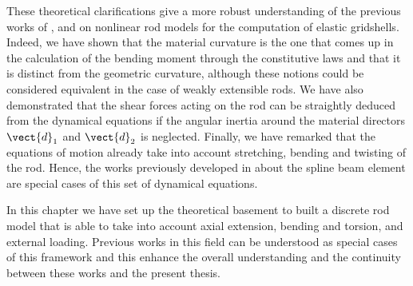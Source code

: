 These theoretical clarifications give a more robust understanding of the previous works of ,  and  on nonlinear rod models for the computation of elastic gridshells. Indeed, we have shown that the material curvature is the one that comes up in the calculation of the bending moment through the constitutive laws and that it is distinct from the geometric curvature, although these notions could be considered equivalent in the case of weakly extensible rods. We have also demonstrated that the shear forces acting on the rod can be straightly deduced from the dynamical equations if the angular inertia around the material directors $\vect{d}_1$ and $\vect{d}_2$ is neglected. Finally, we have remarked that the equations of motion already take into account stretching, bending and twisting of the rod. Hence, the works previously developed in \cite{Adriaenssens1999,Douthe2007} about the  spline beam element are special cases of this set of dynamical equations.

In this chapter we have set up the theoretical basement to built a discrete rod model that is able to take into account axial extension, bending and torsion, and external loading. Previous works in this field can be understood as special cases of this framework and this enhance the overall understanding and the continuity between these works and the present thesis.

